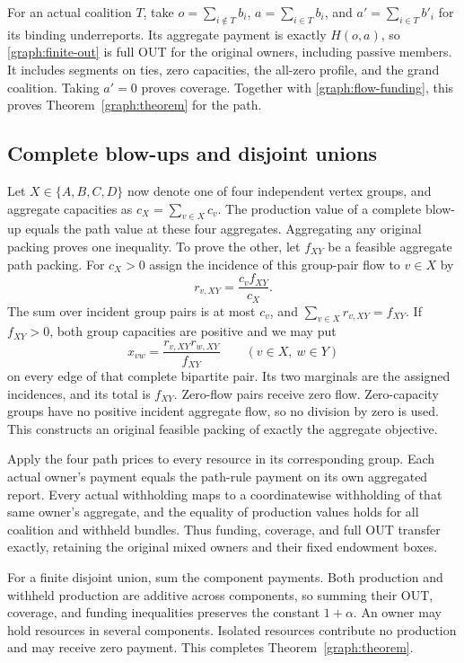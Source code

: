 \documentclass[11pt]{article}
\theoremstyle{definition}\newtheorem{definition}[theorem]{Definition}
\theoremstyle{remark}\newtheorem{remark}[theorem]{Remark}
\begin{document}
For an actual coalition $T$, take $o=\sum_{i\notin T}b_i$,
$a=\sum_{i\in T}b_i$, and $a'=\sum_{i\in T}b'_i$ for its binding
underreports. Its aggregate payment is exactly $H(o,a)$, so
\eqref{graph:finite-out} is full OUT for the original owners, including
passive members. It includes segments on ties, zero capacities, the
all-zero profile, and the grand coalition. Taking $a'=0$ proves coverage.
Together with \eqref{graph:flow-funding}, this proves
Theorem~\ref{graph:theorem} for the path.

\subsection{Complete blow-ups and disjoint unions}

Let $X\in\{A,B,C,D\}$ now denote one of four independent vertex groups,
and aggregate capacities as $c_X=\sum_{v\in X}c_v$. The production value
of a complete blow-up equals the path value at these four aggregates.
Aggregating any original packing proves one inequality. To prove the
other, let $f_{XY}$ be a feasible aggregate path packing. For $c_X>0$ assign
the incidence of this group-pair flow to $v\in X$ by
\[
 r_{v,XY}=\frac{c_v f_{XY}}{c_X}.
\]
The sum over incident group pairs is at most $c_v$, and
$\sum_{v\in X}r_{v,XY}=f_{XY}$. If $f_{XY}>0$, both group capacities
are positive and we may put
\[
 x_{vw}=\frac{r_{v,XY}r_{w,XY}}{f_{XY}}
 \qquad(v\in X,\ w\in Y)
\]
on every edge of that complete bipartite pair. Its two marginals are the
assigned incidences, and its total is $f_{XY}$. Zero-flow pairs receive
zero flow. Zero-capacity groups have no positive incident aggregate flow,
so no division by zero is used. This constructs an original feasible
packing of exactly the aggregate objective.

Apply the four path prices to every resource in its corresponding group.
Each actual owner's payment equals the path-rule payment on its own
aggregated report. Every actual withholding maps to a coordinatewise
withholding of that same owner's aggregate, and the equality of production
values holds for all coalition and withheld bundles. Thus funding,
coverage, and full OUT transfer exactly, retaining the original mixed
owners and their fixed endowment boxes.

For a finite disjoint union, sum the component payments. Both production
and withheld production are additive across components, so summing their
OUT, coverage, and funding inequalities preserves the constant $1+\alpha$.
An owner may hold resources in several components. Isolated resources
contribute no production and may receive zero payment. This completes
Theorem~\ref{graph:theorem}.
\end{document}
